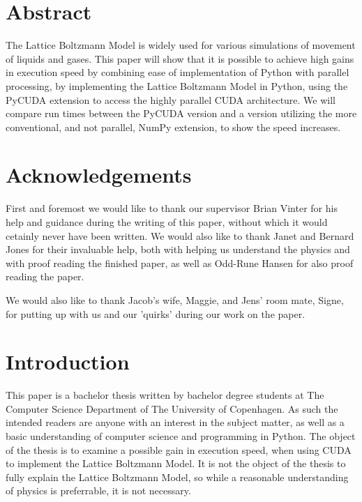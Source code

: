 
\section*{Abstract}

The Lattice Boltzmann Model is widely used for various simulations of movement of liquids and gases. This paper will show that it is possible to achieve high gains in execution speed by combining ease of implementation of Python with parallel processing, by implementing the Lattice Boltzmann Model in Python, using the PyCUDA extension to access the highly parallel CUDA architecture. We will compare run times between the PyCUDA version and a version utilizing the more conventional, and not parallel, NumPy extension, to show the speed increases.

\newpage

\section*{Acknowledgements}

First and foremost we would like to thank our supervisor Brian Vinter for his help and guidance during the writing of this paper, without which it would cetainly never have been written. We would also like to thank Janet and Bernard Jones for their invaluable help, both with helping us understand the physics and with proof reading the finished paper, as well as Odd-Rune Hansen for also proof reading the paper.

We would also like to thank Jacob's wife, Maggie, and Jens' room mate, Signe, for putting up with us and our 'quirks' during our work on the paper.

\newpage
\tableofcontents
\newpage

\section{Introduction}

This paper is a bachelor thesis written by bachelor degree students at The Computer Science Department of The University of Copenhagen. As such the intended readers are anyone with an interest in the subject matter, as well as a basic understanding of computer science and programming in Python. The object of the thesis is to examine a possible gain in execution speed, when using CUDA to implement the Lattice Boltzmann Model. It is not the object of the thesis to fully explain the Lattice Boltzmann Model, so while a reasonable understanding of physics is preferrable, it is not necessary.

